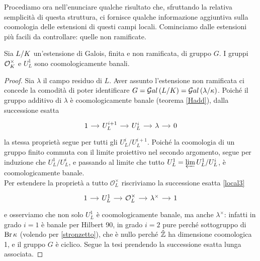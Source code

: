 
Procediamo ora nell'enunciare qualche risultato che, sfruttando la relativa semplicità di questa struttura, ci fornisce qualche informazione aggiuntiva sulla coomologia delle estensioni di questi campi locali. Cominciamo dalle estensioni più facili da controllare: quelle non ramificate.

\begin{theorem}
	Sia $ L/K $ un'estensione di Galois, finita e non ramificata, di gruppo $ G $. I gruppi $ \mathcal{O}_{K}^\times $ e $ U_L^1 $ sono coomologicamente banali.
\end{theorem}
\begin{proof}
	Sia $ \lambda $ il campo residuo di $ L $. Aver assunto l'estensione non ramificata ci concede la comodità di poter identificare $ G = \mathcal{G}al\left( L/K \right) = \mathcal{G}al\left( \lambda / \kappa \right) $. Poiché il gruppo additivo di $ \lambda $ è coomologicamente banale (teorema \ref{Hadd}), dalla successione esatta
	\[\begin{tikzcd}[column sep = small]
	1 \rar
	& U_L^{i+1} \rar
	& U_{L}^i \rar
	& \lambda \rar
	& 0
	\end{tikzcd}\]
	la stessa proprietà segue per tutti gli $ U^i_{L} / U^{i+1}_{L} $.
	Poiché la coomologia di un gruppo finito commuta con il limite proiettivo nel secondo argomento, segue per induzione che $ U^1_{L} / U^{i}_{L} $, e passando al limite che tutto $ U^1_L = \varprojlim U^1_{L} / U^{i}_{L} $, è coomologicamente banale. \\
	
	Per estendere la proprietà a tutto $ \mathcal{O}_{L}^\times $ riscriviamo la successione esatta \ref{local3}
	\begin{equation*}
	\begin{tikzcd}[column sep = small]
	1 \rar
	& U_L^{1} \rar
	& \mathcal{O}_{L}^\times \rar
	& \lambda^\times \rar
	&1
	\end{tikzcd}
	\end{equation*}
	e osserviamo che non solo $  U^1_L $ è coomologicamente banale, ma anche $ \lambda^\times $: infatti in grado $ i = 1 $ è banale per Hilbert 90, in grado $ i = 2 $ pure perché sottogruppo di $ \operatorname{Br} \kappa $ (volendo per \ref{stronzetto}), che è nullo perché $ \hat{\mathbb{Z}} $ ha dimensione coomologica 1, e il gruppo $ G $ è ciclico. Segue la tesi prendendo la successione esatta lunga associata.
\end{proof}

